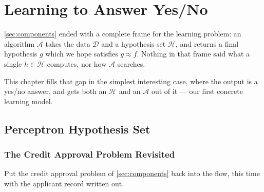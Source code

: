 \chapter{Learning to Answer Yes/No}

\begin{prev}
    \autoref{sec:components} ended with a complete frame for the learning
    problem: an algorithm \(\mathcal{A}\) takes the data \(\mathcal{D}\) and a
    hypothesis set \(\mathcal{H}\), and returns a final hypothesis \(g\) which we
    hope satisfies \(g \approx f\). Nothing in that frame said what a single
    \(h \in \mathcal{H}\) computes, nor how \(\mathcal{A}\) searches.
\end{prev}

This chapter fills that gap in the simplest interesting case, where the output
is a yes/no answer, and gets both an \(\mathcal{H}\) and an \(\mathcal{A}\)
out of it --- our first concrete learning model.

\section{Perceptron Hypothesis Set}\label{sec:perceptron-set}


\subsection{The Credit Approval Problem Revisited}

Put the credit approval problem of \autoref{sec:components} back into the flow,
this time with the applicant record written out.

